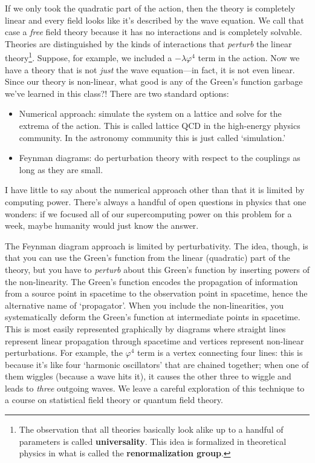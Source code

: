 If we only took the quadratic part of the action, then the theory is completely linear and every field looks like it's described by the wave equation. We call that case a \emph{free} field theory because it has no interactions and is completely solvable. Theories are distinguished by the kinds of interactions that \emph{perturb} the linear theory\footnote{The observation that all theories basically look alike up to a handful of parameters is called \textbf{universality}. This idea is formalized in theoretical physics in what is called the \textbf{renormalization group}.}. Suppose, for example, we included a $-\lambda \varphi^4$ term in the action. Now we have a theory that is not \emph{just} the wave equation---in fact, it is not even linear. Since our theory is non-linear, what good is any of the Green's function garbage we've learned in this class?! There are two standard options:
\begin{itemize}
	\item Numerical approach: simulate the system on a lattice and solve for the extrema of the action. This is called lattice QCD in the high-energy physics community. In the astronomy community this is just called `simulation.' 
	\item Feynman diagrams: do perturbation theory with respect to the couplings as long as they are small. 
\end{itemize}
I have little to say about the numerical approach other than that it is limited by computing power. There's always a handful of open questions in physics that one wonders: if we focused all of our supercomputing power on this problem for a week, maybe humanity would just know the answer.

The Feynman diagram approach is limited by perturbativity. The idea, though, is that you can use the Green's function from the linear (quadratic) part of the theory, but you have to \emph{perturb} about this Green's function by inserting powers of the non-linearity. The Green's function encodes the propagation of information from a source point in spacetime to the observation point in spacetime, hence the alternative name of `propagator'. When you include the non-linearities, you systematically deform the Green's function at intermediate points in spacetime. This is most easily represented graphically by diagrams where straight lines represent linear propagation through spacetime and vertices represent non-linear perturbations. For example, the $\varphi^4$ term is a vertex connecting four lines: this is because it's like four `harmonic oscillators' that are chained together; when one of them wiggles (because a wave hits it), it causes the other three to wiggle and leads to \emph{three} outgoing waves. We leave a careful exploration of this technique to a course on statistical field theory or quantum field theory. 

